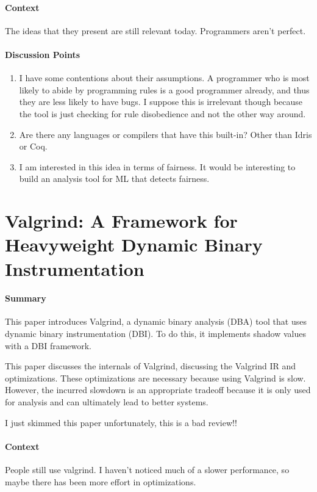 \paragraph{\textbf{Context}}
The ideas that they present are still relevant today. Programmers aren't
perfect.

\paragraph{\textbf{Discussion Points}}
\begin{enumerate}
    \item I have some contentions about their assumptions. A programmer who is
    most likely to abide by programming rules is a good programmer already, and
    thus they are less likely to have bugs. I suppose this is irrelevant though
    because the tool is just checking for rule disobedience and not the other
    way around.
    \item Are there any languages or compilers that have this built-in? Other
    than Idris or Coq.
    \item I am interested in this idea in terms of fairness. It would be
    interesting to build an analysis tool for ML that detects fairness.
\end{enumerate}

\section {Valgrind: A Framework for Heavyweight Dynamic Binary Instrumentation \cite{nethercote2007valgrind}}

\paragraph{\textbf{Summary}}
This paper introduces Valgrind, a dynamic binary analysis (DBA) tool that uses
dynamic binary instrumentation (DBI). To do this, it implements shadow values
with a DBI framework.

This paper discusses the internals of Valgrind, discussing the Valgrind IR and
optimizations. These optimizations are necessary because using Valgrind is slow.
However, the incurred slowdown is an appropriate tradeoff because it is only
used for analysis and can ultimately lead to better systems.

I just skimmed this paper unfortunately, this is a bad review!!

\paragraph{\textbf{Context}}
People still use valgrind. I haven't noticed much of a slower performance, so
maybe there has been more effort in optimizations.

